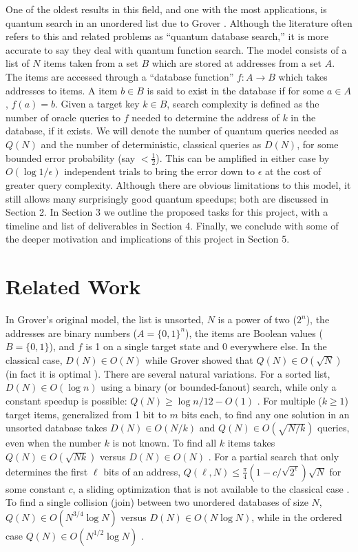 \documentclass{toc}
\theoremstyle{plain}
\theoremstyle{definition}
\begin{document}
One of the oldest results in this field, and one with the most applications,
is quantum
search in an unordered list due to Grover \cite{grover96}. Although the
literature often refers to this and related problems as
``quantum database search,'' it is more accurate to say they deal with
quantum function search. The model consists of a list of $N$ items taken
from a set $B$ which are stored at addresses from a set $A$. The items
are accessed through a ``database function'' $f: A \rightarrow B$ which
takes addresses to items. A item $b \in B$ is said to exist in the database
if for some $a \in A$, $f(a) = b$.
Given a target key $k \in B$, search complexity is
defined as the number of oracle queries to $f$ needed to determine the
address of $k$ in the database, if it exists. We will denote the number of
quantum queries needed as $Q(N)$ and the number of deterministic, classical
queries as $D(N)$, for some bounded error probability (say $< \frac{1}{2}$).
This can be amplified in either case by $O(\log{1/\epsilon})$ independent
trials to bring the error down to $\epsilon$ at the cost of greater query
complexity. Although there are obvious limitations to this model,
it still allows
many surprisingly good quantum speedups; both are discussed in Section 2.
In Section 3 we outline the proposed tasks for this project, with a timeline
and list of deliverables in Section 4. Finally, we conclude with some of the
deeper motivation and implications of this project in Section 5.

\section{Related Work}

In Grover's original model, the list is unsorted, $N$ is
a power of two ($2^n$), the addresses are binary numbers
($A = \{0,1\}^n$), the items are Boolean values ($B = \{0,1\}$), and
$f$ is 1 on a single target state and 0 everywhere else.
In the classical case,
$D(N) \in O(N)$ while Grover showed that $Q(N) \in O(\sqrt{N})$
(in fact it is optimal \cite{grover98}).
There are several natural variations. For a sorted list,
$D(N) \in O(\log{n})$ using a binary (or bounded-fanout) search, while
only a constant speedup is possible: $Q(N) \ge \log{n}/12 - O(1)$
\cite{ambainis99}.
For multiple ($k \ge 1$) target items, generalized from 1 bit to $m$ bits each,
to find any one solution in an unsorted database takes $D(N) \in O(N/k)$ and
$Q(N) \in O(\sqrt{N/k})$
queries, even when the number $k$ is not known. To
find all $k$ items takes $Q(N) \in O(\sqrt{Nk})$ versus $D(N) \in O(N)$
\cite{bbht98}.
For a partial search that only determines the first $\ell$ bits of an address,
$Q(\ell, N) \le \frac{\pi}{4}(1 - c/\sqrt{2^\ell})\sqrt{N}$ for some
constant $c$, a sliding
optimization that is not available to the classical case \cite{gr04}.
To find a single collision (join) between two unordered databases of size
$N$,
$Q(N) \in O(N^{3/4}\log{N})$ versus $D(N) \in O(N\log{N})$, while in the
ordered case $Q(N) \in O(N^{1/2}\log{N})$
\cite{heiligman00}.
\end{document}
